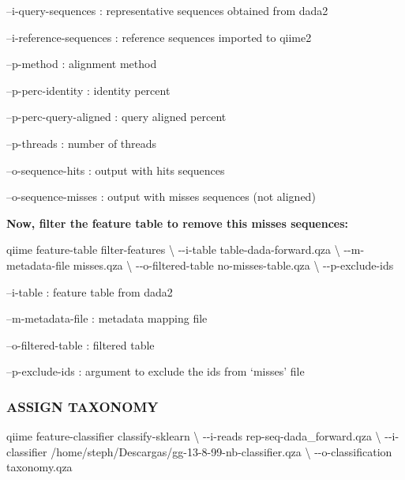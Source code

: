 \documentclass[]{interact}
\theoremstyle{plain}%
\theoremstyle{definition}
\theoremstyle{remark}
\newenvironment{Shaded}{\begin{snugshade}}{\end{snugshade}}
\newcommand{\DataTypeTok}[1]{\textcolor[rgb]{0.13,0.29,0.53}{#1}}
\newcommand{\ExtensionTok}[1]{#1}
\newcommand{\NormalTok}[1]{#1}
\begin{document}
--i-query-sequences : representative sequences obtained from dada2

--i-reference-sequences : reference sequences imported to qiime2

--p-method : alignment method

--p-perc-identity : identity percent

--p-perc-query-aligned : query aligned percent

--p-threads : number of threads

--o-sequence-hits : output with hits sequences

--o-sequence-misses : output with misses sequences (not aligned)

\textbf{Now, filter the feature table to remove this misses sequences:}

\begin{Shaded}
\begin{Highlighting}[]
\ExtensionTok{qiime}\NormalTok{ feature{-}table filter{-}features }\DataTypeTok{\textbackslash{}}
\NormalTok{{-}{-}i{-}table table{-}dada{-}forward.qza }\DataTypeTok{\textbackslash{}}
\NormalTok{{-}{-}m{-}metadata{-}file misses.qza }\DataTypeTok{\textbackslash{}}
\NormalTok{{-}{-}o{-}filtered{-}table no{-}misses{-}table.qza  }\DataTypeTok{\textbackslash{}}
\NormalTok{{-}{-}p{-}exclude{-}ids}
\end{Highlighting}
\end{Shaded}

--i-table : feature table from dada2

--m-metadata-file : metadata mapping file

--o-filtered-table : filtered table

--p-exclude-ids : argument to exclude the ids from `misses' file

\hypertarget{assign-taxonomy}{%
\subsubsection{ASSIGN TAXONOMY}\label{assign-taxonomy}}

\begin{Shaded}
\begin{Highlighting}[]
\ExtensionTok{qiime}\NormalTok{ feature{-}classifier classify{-}sklearn }\DataTypeTok{\textbackslash{}}
\NormalTok{{-}{-}i{-}reads rep{-}seq{-}dada\_forward.qza }\DataTypeTok{\textbackslash{}}
\NormalTok{{-}{-}i{-}classifier /home/steph/Descargas/gg{-}13{-}8{-}99{-}nb{-}classifier.qza }\DataTypeTok{\textbackslash{}}
\NormalTok{{-}{-}o{-}classification taxonomy.qza}
\end{Highlighting}
\end{Shaded}
\end{document}
